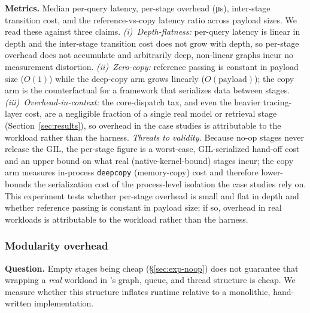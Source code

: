 \textbf{Metrics.} Median per-query latency, per-stage overhead
(\si{\micro\second}), inter-stage transition cost, and the reference-vs-copy
latency ratio across payload sizes. We read these against three claims.
\emph{(i)~Depth-flatness:} per-query latency is linear in depth and the
inter-stage transition cost does not grow with depth, so per-stage overhead does
not accumulate and arbitrarily deep, non-linear graphs incur no measurement
distortion. \emph{(ii)~Zero-copy:} reference passing is constant in payload size
($O(1)$) while the deep-copy arm grows linearly ($O(\text{payload})$); the
copy arm is the counterfactual for a framework that serializes data between
stages. \emph{(iii)~Overhead-in-context:} the core-dispatch tax, and even the
heavier tracing-layer cost, are a negligible fraction of a single real model or
retrieval stage (Section~\ref{sec:results}), so overhead in the case studies is
attributable to the workload rather than the harness. \emph{Threats to validity.}
Because no-op
stages never release the GIL, the per-stage figure is a worst-case,
GIL-serialized hand-off cost and an upper bound on what real
(native-kernel-bound) stages incur; the copy arm measures in-process
\texttt{deepcopy} (memory-copy) cost and therefore lower-bounds the
serialization cost of the process-level isolation the case studies rely on.
This experiment tests whether per-stage overhead is small and flat in depth and
whether reference passing is constant in payload size; if so, overhead in real
workloads is attributable to the workload rather than the harness.

\subsubsection{Modularity overhead}
\label{sec:exp-modularity}

\textbf{Question.} Empty stages being cheap (\S\ref{sec:exp-noop}) does not
guarantee that wrapping a \emph{real} workload in \sysname{}'s graph, queue, and
thread structure is cheap. We measure whether this structure inflates runtime
relative to a monolithic, hand-written implementation.

